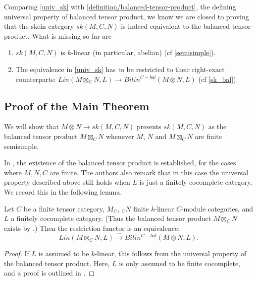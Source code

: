 \begin{remark}
  Comparing \ref{univ_sk} with \ref{definition/balanced-tensor-product}, the
  defining universal property of balanced tensor product, we know we are
  closed to proving that the skein category $sk(M,C,N)$ is indeed equivalent
  to the balanced tensor product. What is missing so far are

  \begin{enumerate}
    \item $sk(M,C,N)$ is $k$-linear (in particular, abelian) (cf \ref{semisimple}).
    \item The equivalence in \ref{univ_sk} has to be restricted to their
          right-exact counterparts:
          $Lin(M \boxtimes_{C} N, L) \to Bilin^{C-bal}(M \otimes N, L)$ (cf \ref{sk_bal}).
  \end{enumerate}
\end{remark}

\subsection{Proof of the Main Theorem}

We will show that $M\otimes N\to sk(M,C,N)$ presents $sk(M,C,N)$ as the
balanced tensor product $M\boxtimes_C N$ whenever $M$, $N$ and $M\boxtimes_C
N$ are finite semisimple.

In \cite{douglas/balanced-product}, the existence of the balanced tensor
product is established, for the cases where $M,N,C$ are finite. The authors
also remark that in this case the universal property described above still
holds when $L$ is just a finitely cocomplete category. We record this in the
following lemma.

\begin{lemma}\label{univ_box}

  \noindent
  Let $C$ be a finite tensor category, $M_C$, $_{C}N$ finite $k$-linear
  $C$-module categories, and $L$ a finitely cocomplete category. (Thus the
  balanced tensor product $M \boxtimes_C N$ exists by
  \cite{douglas/balanced-product}.) Then the restriction functor is an
  equivalence:
  \[Lin(M \boxtimes_{C} N, L) \xrightarrow{\sim} Bilin^{C-bal}(M \otimes N, L).\]
\end{lemma}

\begin{proof}
  If $L$ is assumed to be $k$-linear, this follows from the universal property
  of the balanced tensor product. Here, $L$ is only assumed to be finite
  cocomplete, and a proof is outlined in \cite[Remark 3.4]{douglas/balanced-product}.
\end{proof}

